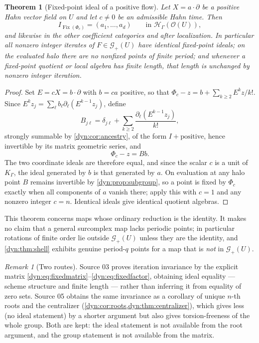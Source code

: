 \documentclass[11pt,letterpaper]{article}
\newtheorem{theorem}{Theorem}[section]
\theoremstyle{definition}
\theoremstyle{remark}
\newtheorem{remark}[remark]{Remark}
\newcommand{\HH}{\mathscr H}
\newcommand{\OO}{\mathcal O}
\newcommand{\GG}{\mathscr G}
\newcommand{\Fix}{\operatorname{Fix}}
\numberwithin{equation}{section}
\begin{document}
\begin{theorem}[Fixed-point ideal of a positive flow]\label{dyn:thm:fixed-ideal}
Let $X=a\cdot\partial$ be a positive Hahn vector field on $U$ and let
$c\ne0$ be an admissible Hahn time. Then
\begin{equation}\label{dyn:eq:fixed-ideal}
 I_{\Fix(\Phi_c)}=(a_1,\dots,a_d)\qquad\text{in }\HH_\Gamma(\OO(U)),
\end{equation}
and likewise in the other coefficient categories and after localization. In
particular all nonzero integer iterates of $F\in\GG_+(U)$ have identical
fixed-point ideals; on the evaluated halo there are no nonfixed points of
finite period; and whenever a fixed-point quotient or local algebra has
finite length, that length is unchanged by nonzero integer iteration.
\end{theorem}
\begin{proof}
Set $E=cX=b\cdot\partial$ with $b=ca$ positive, so that
$\Phi_c-z=b+\sum_{k\ge2}E^{k}z/k!$. Since
$E^{k}z_j=\sum_\ell b_\ell\partial_\ell(E^{k-1}z_j)$, define
\begin{equation}\label{dyn:eq:fixedmatrix}
 B_{j\ell}=\delta_{j\ell}+\sum_{k\ge2}\frac{\partial_\ell(E^{k-1}z_j)}{k!},
\end{equation}
strongly summable by \cref{dyn:cor:ancestry}, of the form
$I+\text{positive}$, hence invertible by its matrix geometric series, and
\begin{equation}\label{dyn:eq:fixedfactor}
 \Phi_c-z=Bb.
\end{equation}
The two coordinate ideals are therefore equal, and since the scalar $c$ is
a unit of $K_\Gamma$, the ideal generated by $b$ is that generated by $a$.
On evaluation at any halo point $B$ remains invertible by
\cref{dyn:prop:subgroup}, so a point is fixed by $\Phi_c$ exactly when all
components of $a$ vanish there; apply this with $c=1$ and any nonzero
integer $c=n$. Identical ideals give identical quotient algebras.
\end{proof}

This theorem concerns maps whose ordinary reduction is the identity. It
makes no claim that a general surcomplex map lacks periodic points; in
particular rotations of finite order lie outside $\GG_+(U)$ unless they are
the identity, and \cref{dyn:thm:shell} exhibits genuine period-$q$ points
for a map that is \emph{not} in $\GG_+(U)$.

\begin{remark}[Two routes]\label{dyn:rem:tworoutes-fixed}
Source 03 proves iteration invariance by the explicit matrix
\eqref{dyn:eq:fixedmatrix}--\eqref{dyn:eq:fixedfactor}, obtaining ideal
equality --- scheme structure and finite length --- rather than inferring
it from equality of zero sets. Source 05 obtains the same invariance as a
corollary of unique $n$-th roots and the centralizer
(\cref{dyn:cor:roots,dyn:thm:centralizer}), which gives less (no ideal
statement) by a shorter argument but also gives torsion-freeness of the
whole group. Both are kept: the ideal statement is not available from the
root argument, and the group statement is not available from the matrix.
\end{remark}
\end{document}
